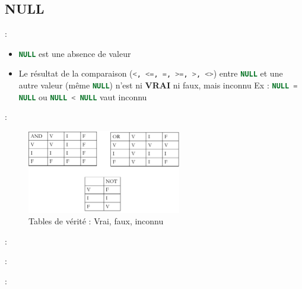 \documentclass[10pt]{beamer}
\begin{document}
\subsection{NULL}
\begin{frame}{\secname : \subsecname}
    \begin{itemize}
        \item \lstinline[language=sql]!NULL! est une absence de valeur
        \item Le résultat de la comparaison (\lstinline[language=sql]!<, <=, =, >=, >, <>!) entre \lstinline[language=sql]!NULL! et une autre valeur (même \lstinline[language=sql]!NULL!) n'est ni \textbf{VRAI} ni faux, mais inconnu
              Ex : \lstinline[language=sql]!NULL = NULL! ou \lstinline[language=sql]!NULL < NULL! vaut inconnu
    \end{itemize}
\end{frame}
\begin{frame}{\secname : \subsecname}
    \begin{figure}
        \begin{center}
            \includegraphics[width=0.60\textwidth]{../assets/img/table_verite.pdf}
            \caption{Tables de vérité : Vrai, faux, inconnu}
        \end{center}
    \end{figure}
\end{frame}
\begin{frame}{\secname : \subsecname}
    
\end{frame}

\begin{frame}{\secname : \subsecname}
    
\end{frame}
\begin{frame}{\secname : \subsecname}
    
\end{frame}
\end{document}
